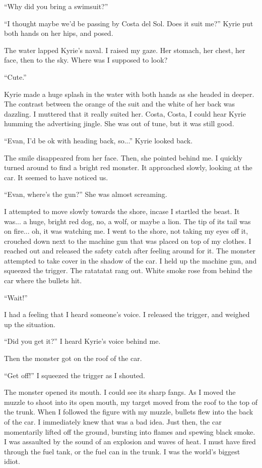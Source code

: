 \documentclass[oneside]{book}
\begin{document}
“Why did you bring a swimsuit?”

“I thought maybe we’d be passing by Costa del Sol. Does it suit me?” Kyrie put both hands on her hips, and posed.

The water lapped Kyrie’s naval. I raised my gaze. Her stomach, her chest, her face, then to the sky. Where was I supposed to look?

“Cute.”

Kyrie made a huge splash in the water with both hands as she headed in deeper. The contrast between the orange of the suit and the white of her back was dazzling. I muttered that it really suited her. Costa, Costa, I could hear Kyrie humming the advertising jingle. She was out of tune, but it was still good.

“Evan, I’d be ok with heading back, so...” Kyrie looked back.

The smile disappeared from her face. Then, she pointed behind me. I quickly turned around to find a bright red monster. It approached slowly, looking at the car. It seemed to have noticed us.

“Evan, where’s the gun?” She was almost screaming.

I attempted to move slowly towards the shore, incase I startled the beast. It was... a huge, bright red dog, no, a wolf, or maybe a lion. The tip of its tail was on fire... oh, it was watching me. I went to the shore, not taking my eyes off it, crouched down next to the machine gun that was placed on top of my clothes. I reached out and released the safety catch after feeling around for it. The monster attempted to take cover in the shadow of the car. I held up the machine gun, and squeezed the trigger. The ratatatat rang out. White smoke rose from behind the car where the bullets hit.

“Wait!”

I had a feeling that I heard someone’s voice. I released the trigger, and weighed up the situation.

“Did you get it?” I heard Kyrie’s voice behind me.

Then the monster got on the roof of the car.

“Get off!” I squeezed the trigger as I shouted.

The monster opened its mouth. I could see its sharp fangs. As I moved the muzzle to shoot into its open mouth, my target moved from the roof to the top of the trunk. When I followed the figure with my muzzle, bullets flew into the back of the car. I immediately knew that was a bad idea. Just then, the car momentarily lifted off the ground, bursting into flames and spewing black smoke. I was assaulted by the sound of an explosion and waves of heat. I must have fired through the fuel tank, or the fuel can in the trunk. I was the world’s biggest idiot.
\end{document}
